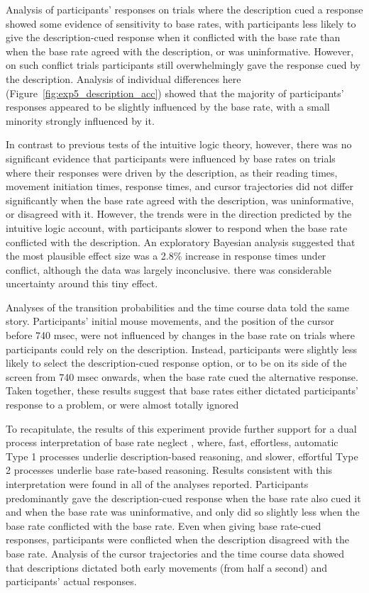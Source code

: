 Analysis of participants' responses
on trials where the description cued a response showed
some evidence of sensitivity to base rates,
with participants less likely to give the description-cued response
when it conflicted with the base rate
than when the base rate agreed with the description, or was uninformative.
However, on such conflict trials participants
still overwhelmingly gave the response cued by the description.
Analysis of individual differences here
(Figure~\ref{fig:exp5_description_acc})
showed that the majority of participants' responses
appeared to be slightly influenced by the base rate,
with a small minority strongly influenced by it.

In contrast to previous tests of the intuitive logic theory, however,
\citep{DeNeys2008,DeNeys2008a,Franssens2009,Pennycook2012a}
there was no significant evidence that participants were
influenced by base rates on trials where their responses
were driven by the description,
as their reading times, movement initiation times,
response times, and cursor trajectories
did not differ significantly when the base rate
agreed with the description, was uninformative, or disagreed with it.
However, the trends were in the direction predicted by the intuitive logic account,
with participants slower to respond when the base rate conflicted with the description.
An exploratory Bayesian analysis suggested that
the most plausible effect size was a 2.8\% increase in response times under conflict,
although the data was largely inconclusive.
there was considerable uncertainty around this tiny effect.

Analyses of the transition probabilities
and the time course data told the same story.
Participants' initial mouse movements,
and the position of the cursor before 740 msec,
were not influenced by changes in the base rate
on trials where participants could rely on the description.
Instead, participants were slightly less likely
to select the description-cued response option,
or to be on its side of the screen from 740 msec onwards,
when the base rate cued the alternative response.
Taken together, these results suggest that
base rates either dictated participants' response to a problem,
or were almost totally ignored


To recapitulate, the results of this experiment
provide further support for a dual process interpretation
of base rate neglect \citep{Kahneman2002,Kahneman2005},
where, fast, effortless, automatic Type 1 processes
underlie description-based reasoning,
and slower, effortful Type 2 processes underlie
base rate-based reasoning.
Results consistent with this interpretation
were found in all of the analyses reported.
Participants predominantly gave the description-cued response
when the base rate also cued it and when the base rate was uninformative,
and only did so slightly less when the base rate conflicted with the base rate.
Even when giving base rate-cued responses,
participants were conflicted when the description disagreed with the base rate.
Analysis of the cursor trajectories and the time course data
showed that descriptions dictated both early movements (from half a second)
and participants' actual responses.

